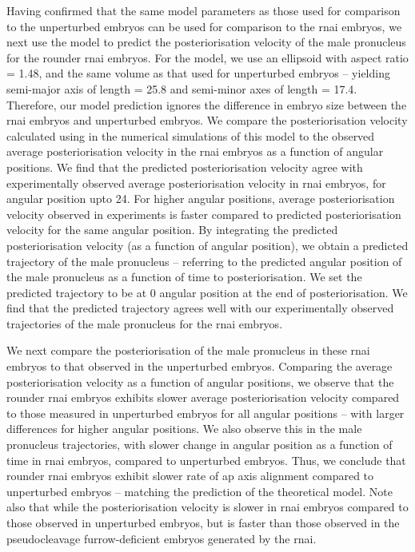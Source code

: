 Having confirmed that the same model parameters as those used for comparison to the unperturbed embryos can be used for comparison to the  \ac{rnai} embryos, we next use the model to predict the posteriorisation velocity of the male pronucleus for the rounder \ac{rnai} embryos. For the model, we use an ellipsoid with aspect ratio \aspectRatio = \num{1.48}, and the same volume as that used for unperturbed embryos -- yielding semi-major axis of length \longAxisLength = \SI{25.8}{\unitLength} and semi-minor axes of length \shortAxisLength = \SI{17.4}{\unitLength}. Therefore, our model prediction ignores the difference in embryo size between the \ac{rnai} embryos and unperturbed embryos. We compare the posteriorisation velocity calculated using in the numerical simulations of this model to the observed average posteriorisation velocity in the \ac{rnai} embryos as a function of angular positions. We find that the predicted posteriorisation velocity agree with experimentally observed average posteriorisation velocity in \ac{rnai} embryos, for angular position upto \SI{24}{\unitAngle}. For higher angular positions, average posteriorisation velocity observed in experiments is faster compared to predicted posteriorisation velocity for the same angular position. By integrating the predicted posteriorisation velocity (as a function of angular position), we obtain a predicted trajectory of the male pronucleus -- referring to the predicted angular position of the male pronucleus as a function of time to posteriorisation. We set the predicted trajectory to be at \SI{0}{\unitAngle} angular position at the end of posteriorisation. We find that the predicted trajectory agrees well with our experimentally observed trajectories of the male pronucleus for the \ac{rnai} embryos.

We next compare the posteriorisation of the male pronucleus in these \ac{rnai} embryos to that observed in the unperturbed embryos. Comparing the average posteriorisation velocity as a function of angular positions, we observe that the rounder \ac{rnai} embryos exhibits slower average posteriorisation velocity compared to those measured in unperturbed embryos for all angular positions -- with larger differences for higher angular positions. We also observe this in the male pronucleus trajectories, with slower change in angular position as a function of time in \ac{rnai} embryos, compared to unperturbed embryos. Thus, we conclude that rounder  \ac{rnai} embryos exhibit slower rate of \ac{ap} axis alignment compared to unperturbed embryos -- matching the prediction of the theoretical model. Note also that while the posteriorisation velocity is slower in  \ac{rnai} embryos compared to those observed in unperturbed embryos, but is faster than those observed in the pseudocleavage furrow-deficient embryos generated by the  \ac{rnai}.

